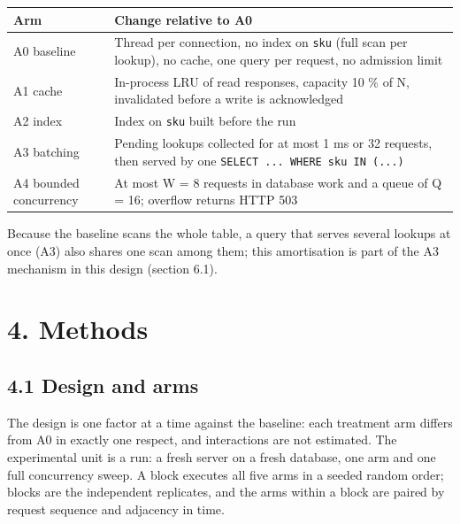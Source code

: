 \documentclass[
]{article}
\begin{document}
\begin{longtable}[]{@{}
  >{\raggedright\arraybackslash}p{}
  >{\raggedright\arraybackslash}p{}@{}}
\toprule\noalign{}
\begin{minipage}[b]{\linewidth}\raggedright
Arm
\end{minipage} & \begin{minipage}[b]{\linewidth}\raggedright
Change relative to A0
\end{minipage} \\
\midrule\noalign{}
\endhead
\bottomrule\noalign{}
\endlastfoot
A0 baseline & Thread per connection, no index on \texttt{sku} (full scan
per lookup), no cache, one query per request, no admission limit \\
A1 cache & In-process LRU of read responses, capacity 10 \% of N,
invalidated before a write is acknowledged \\
A2 index & Index on \texttt{sku} built before the run \\
A3 batching & Pending lookups collected for at most 1 ms or 32 requests,
then served by one \texttt{SELECT\ ...\ WHERE\ sku\ IN\ (...)} \\
A4 bounded concurrency & At most W = 8 requests in database work and a
queue of Q = 16; overflow returns HTTP 503 \\
\end{longtable}

Because the baseline scans the whole table, a query that serves several
lookups at once (A3) also shares one scan among them; this amortisation
is part of the A3 mechanism in this design (section 6.1).

\section{4. Methods}\label{methods}

\subsection{4.1 Design and arms}\label{design-and-arms}

The design is one factor at a time against the baseline: each treatment
arm differs from A0 in exactly one respect, and interactions are not
estimated. The experimental unit is a run: a fresh server on a fresh
database, one arm and one full concurrency sweep. A block executes all
five arms in a seeded random order; blocks are the independent
replicates, and the arms within a block are paired by request sequence
and adjacency in time.
\end{document}
